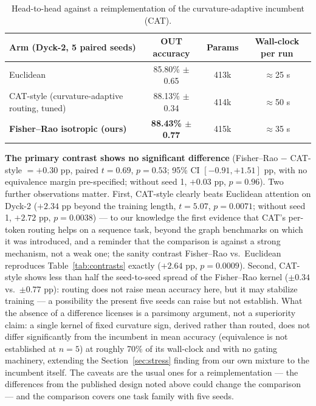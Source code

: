 \documentclass[11pt]{article}
\begin{document}
\begin{table}[h]
\centering\small
\begin{tabular}{lccc}
\toprule
Arm (Dyck-2, 5 paired seeds) & OUT accuracy & Params & Wall-clock per run \\
\midrule
Euclidean & 85.80\% $\pm$ 0.65 & 413k & $\approx$25 s \\
CAT-style (curvature-adaptive routing, tuned) & 88.13\% $\pm$ 0.34 & 414k & $\approx$50 s \\
\textbf{Fisher--Rao isotropic (ours)} & \textbf{88.43\% $\pm$ 0.77} & 415k & $\approx$35 s \\
\bottomrule
\end{tabular}
\caption{Head-to-head against a reimplementation of the curvature-adaptive incumbent (CAT).}
\label{tab:cat}
\end{table}

\textbf{The primary contrast shows no significant difference} (Fisher--Rao $-$ CAT-style $= +0.30$ pp, paired $t = 0.69$, $p = 0.53$; 95\% CI $[-0.91, +1.51]$ pp, with no equivalence margin pre-specified; without seed 1, $+0.03$ pp, $p = 0.96$). Two further observations matter. First, CAT-style clearly beats Euclidean attention on Dyck-2 ($+2.34$ pp beyond the training length, $t = 5.07$, $p = 0.0071$; without seed 1, $+2.72$ pp, $p = 0.0038$) --- to our knowledge the first evidence that CAT's per-token routing helps on a sequence task, beyond the graph benchmarks on which it was introduced, and a reminder that the comparison is against a strong mechanism, not a weak one; the sanity contrast Fisher--Rao vs.\ Euclidean reproduces Table~\ref{tab:contrasts} exactly ($+2.64$ pp, $p = 0.0009$). Second, CAT-style shows less than half the seed-to-seed spread of the Fisher--Rao kernel ($\pm 0.34$ vs.\ $\pm 0.77$ pp): routing does not raise mean accuracy here, but it may stabilize training --- a possibility the present five seeds can raise but not establish. What the absence of a difference licenses is a parsimony argument, not a superiority claim: a single kernel of fixed curvature sign, derived rather than routed, does not differ significantly from the incumbent in mean accuracy (equivalence is not established at $n = 5$) at roughly 70\% of its wall-clock and with no gating machinery, extending the Section~\ref{sec:stress} finding from our own mixture to the incumbent itself. The caveats are the usual ones for a reimplementation --- the differences from the published design noted above could change the comparison --- and the comparison covers one task family with five seeds.
\end{document}
